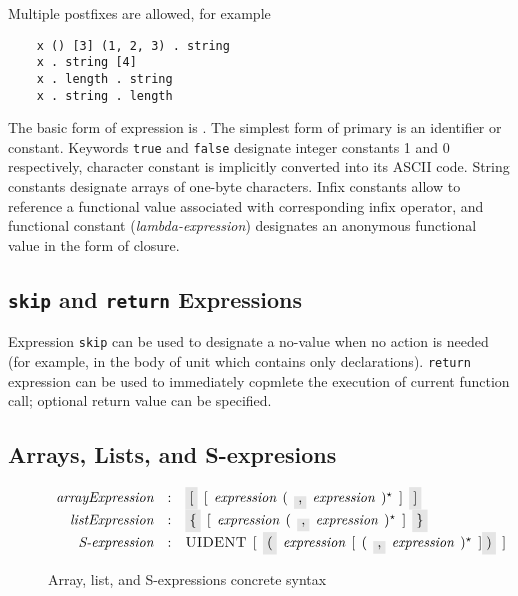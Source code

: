 Multiple postfixes are allowed, for example

\begin{lstlisting}
    x () [3] (1, 2, 3) . string
    x . string [4]
    x . length . string
    x . string . length
\end{lstlisting}

The basic form of expression is . The simplest form of primary is an identifier or constant. Keywords \lstinline|true| and \lstinline|false|
designate integer constants 1 and 0 respectively, character constant is implicitly converted into its ASCII code.  String constants designate arrays
of one-byte characters. Infix constants allow to reference a functional value associated with corresponding infix operator, and functional constant (\emph{lambda-expression})
designates an anonymous functional value in the form of closure.

\subsection{\lstinline|skip| and \lstinline|return| Expressions}

Expression \lstinline|skip| can be used to designate a no-value when no action is needed (for example, in the body of unit which contains only declarations).
\lstinline|return| expression can be used to immediately copmlete the execution of current function call; optional return value can be specified.

\subsection{Arrays, Lists, and S-expresions}

\begin{figure}[t]
  \[
    \begin{array}{rcl}
      \defterm{arrayExpression} & : & \term{[}\s[\s\nonterm{expression}\s(\s\term{,}\s\nonterm{expression}\s)^\star\s]\s\term{]}\\
      \defterm{listExpression}  & : & \term{\{}\s[\s\nonterm{expression}\s(\s\term{,}\s\nonterm{expression}\s)^\star\s]\s\term{\}}\\
      \defterm{S-expression}    & : & \token{UIDENT}\s[\s\term{(}\s\nonterm{expression}\s[\s(\s\term{,}\s\nonterm{expression}\s)^\star\s]\term{)}\s]
    \end{array}
  \]
  \caption{Array, list, and S-expressions concrete syntax}  
  \label{composite_expressions}
\end{figure}

